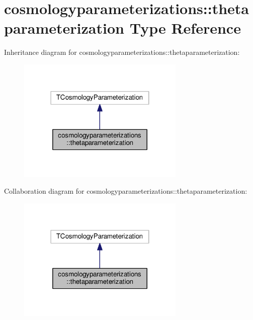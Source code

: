 \hypertarget{structcosmologyparameterizations_1_1thetaparameterization}{}\section{cosmologyparameterizations\+:\+:thetaparameterization Type Reference}
\label{structcosmologyparameterizations_1_1thetaparameterization}


Inheritance diagram for cosmologyparameterizations\+:\+:thetaparameterization\+:
\nopagebreak
\begin{figure}[H]
\begin{center}
\leavevmode
\includegraphics[width=226pt]{structcosmologyparameterizations_1_1thetaparameterization__inherit__graph}
\end{center}
\end{figure}


Collaboration diagram for cosmologyparameterizations\+:\+:thetaparameterization\+:
\nopagebreak
\begin{figure}[H]
\begin{center}
\leavevmode
\includegraphics[width=226pt]{structcosmologyparameterizations_1_1thetaparameterization__coll__graph}
\end{center}
\end{figure}
